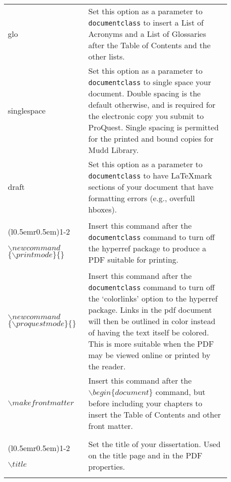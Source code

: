 \begin{longtable}{p{0.3\linewidth} p{0.6\linewidth}}
  glo &
  Set this option as a parameter to \texttt{documentclass} to insert a List of Acronyms and a List of Glossaries after the Table of Contents and the other lists.
  \\

  singlespace &
  Set this option as a parameter to \texttt{documentclass} to single space your document. Double spacing is the default otherwise, and is required for the electronic copy you submit to ProQuest. Single spacing is permitted for the printed and bound copies for Mudd Library.
  \\
  
  draft &
  Set this option as a parameter to \texttt{documentclass} to have \LaTeX mark sections of your document that have formatting errors (e.g., overfull hboxes). 
  \\

  \cmidrule[0.1pt](l{0.5em}r{0.5em}){1-2}

  \raggedright
  $\backslash newcommand$ $\{\backslash printmode\}\{\}$ &
  Insert this command after the \texttt{documentclass} command to turn off the hyperref package to produce a PDF suitable for printing.
  \\

  \raggedright
  $\backslash newcommand$ $\{\backslash proquestmode\}\{\}$  &
  Insert this command after the \texttt{documentclass} command to turn off the `colorlinks' option to the hyperref package. Links in the pdf document will then be outlined in color instead of having the text itself be colored. This is more suitable when the PDF may be viewed online or printed by the reader.
  \\

  $\backslash makefrontmatter$ &
  Insert this command after the \texttt{$\backslash begin\{document\}$} command, but before including your chapters to insert the Table of Contents and other front matter.
  \\
  
  \cmidrule[0.1pt](l{0.5em}r{0.5em}){1-2}

  $\backslash title$ &
  Set the title of your dissertation. Used on the title page and in the PDF properties.
  \\


\end{longtable}
